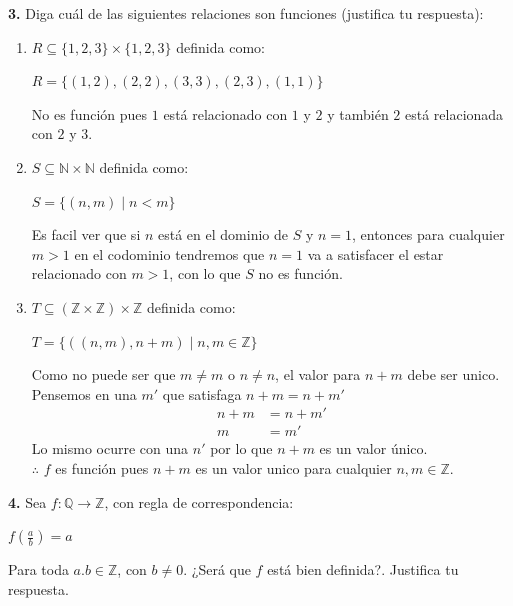 \documentclass[12pt]{article}
\begin{document}
\vspace{0.5cm}
%
%
\textbf{3.} Diga cuál de las siguientes relaciones son funciones (justifica tu respuesta):
\begin{enumerate}[label=\alph*)]
    \item $R \subseteq \{1,2,3\} \times \{1,2,3\}$ definida como:\\
    \begin{center}
        $R = \{(1,2),(2,2),(3,3),(2,3),(1,1)\}$
    \end{center}
    No es función pues $1$ está relacionado con $1$ y $2$ y también $2$ está relacionada con $2$ y $3$.

    \item $S \subseteq \mathbb{N} \times \mathbb{N}$ definida como:\\
    \begin{center}
        $S = \{(n,m) \mid n < m\}$
    \end{center}
    Es facil ver que si $n$ está en el dominio de $S$ y $n = 1$, entonces para cualquier $m > 1$ en el codominio tendremos que $n = 1$
    va a satisfacer el estar relacionado con $m > 1$, con lo que $S$ no es función.
    
    \item $T \subseteq ( \mathbb{Z} \times \mathbb{Z} ) \times \mathbb{Z}$ definida como:\\
    \begin{center}
        $T = \{((n,m),n+m) \mid n, m \in \mathbb{Z}\}$
    \end{center}
    Como no puede ser que $m \neq m$ o $n \neq n$, el valor para $n + m$ debe ser unico.\\

    Pensemos en una $m'$ que satisfaga $n + m = n + m'$
    \begin{align*}
        n + m &= n + m'\\
        m &= m'
    \end{align*}
    Lo mismo ocurre con una $n'$ por lo que $n + m$ es un valor único.\\

    $\therefore$ $f$ es función pues $n + m$ es un valor unico para cualquier $n, m \in \mathbb{Z}$.

\end{enumerate}

\vspace{0.5cm}
%
%
\textbf{4.} Sea ${\displaystyle f: \mathbb{Q} \longrightarrow \mathbb{Z}}$, con regla de correspondencia:\\
\begin{center}
    ${\displaystyle f(\frac{a}{b}) = a}$
\end{center}
Para toda $a.b \in \mathbb{Z}$, con $b \neq 0$. ¿Será que ${\displaystyle f}$ está bien definida?. Justifica tu respuesta.
\end{document}
